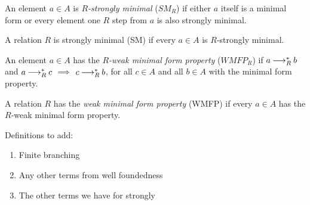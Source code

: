 \begin{definition}
    An element $a \in A$ is \emph{$R$-strongly minimal} ($SM_R$) if either $a$ itself is a minimal form or every element one $R$ step
    from $a$ is also strongly minimal.
  
    A relation $R$ is strongly minimal (SM) if every
    $a \in A$ is $R$-strongly minimal.
\end{definition}

\begin{definition}
   An element $a \in A$ has the \emph{${R}$-weak minimal form property} ($WMFP_R$) if
   $a \mathbin{\longrightarrow_R^*} b$ and $a \mathbin{\longrightarrow_R^*} c$  $\implies$
   $c \mathbin{\longrightarrow_R^*} b$, for all $c \in A$ and all $b \in A$ with the minimal form property.

   A relation $R$ has the \emph{weak minimal form property} (WMFP) if every $a \in A$ has the $R$-weak minimal form property.
\end{definition}

Definitions to add:
\begin{enumerate}
    \item Finite branching
    \item Any other terms from well foundedness
    \item The other terms we have for strongly 
\end{enumerate}






